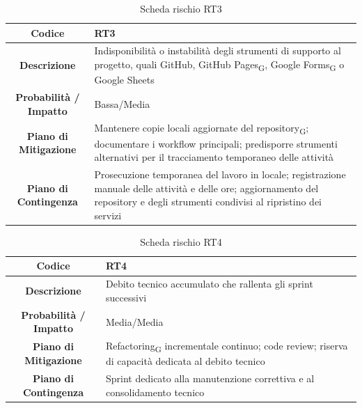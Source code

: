 \begin{table}[H]
	\centering
	\renewcommand{\arraystretch}{1.3}
	\begin{tabularx}{\textwidth}{|c|X|}
		\hline
		\textbf{Codice} & \textbf{RT3} \\
		\hline
		\textbf{Descrizione} & Indisponibilità o instabilità degli strumenti di supporto al progetto, quali GitHub, GitHub Pages\textsubscript{G}, Google Forms\textsubscript{G} o Google Sheets \\
		\hline
		\textbf{Probabilità / Impatto} & Bassa/Media \\
		\hline
		\textbf{Piano di Mitigazione} & Mantenere copie locali aggiornate del repository\textsubscript{G}; documentare i workflow principali; predisporre strumenti alternativi per il tracciamento temporaneo delle attività \\
		\hline
		\textbf{Piano di Contingenza} & Prosecuzione temporanea del lavoro in locale; registrazione manuale delle attività e delle ore; aggiornamento del repository e degli strumenti condivisi al ripristino dei servizi \\
		\hline
	\end{tabularx}
	\caption{Scheda rischio RT3}
\end{table}

\begin{table}[H]
	\centering
	\renewcommand{\arraystretch}{1.3}
	\begin{tabularx}{\textwidth}{|c|X|}
		\hline
		\textbf{Codice} & \textbf{RT4} \\
		\hline
		\textbf{Descrizione} & Debito tecnico accumulato che rallenta gli sprint successivi \\
		\hline
		\textbf{Probabilità / Impatto} & Media/Media \\
		\hline
		\textbf{Piano di Mitigazione} & Refactoring\textsubscript{G} incrementale continuo; code review; riserva di capacità dedicata al debito tecnico \\
		\hline
		\textbf{Piano di Contingenza} & Sprint dedicato alla manutenzione correttiva e al consolidamento tecnico \\
		\hline
	\end{tabularx}
	\caption{Scheda rischio RT4}
\end{table}

